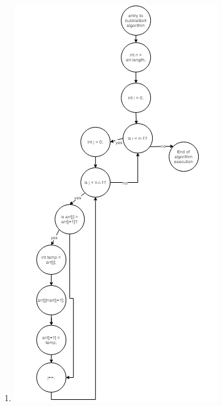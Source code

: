 \documentclass[12pt]{article}
\begin{document}
\begin{enumerate}
\item \noindent

\includegraphics{cfg.png}

\end{enumerate}
\end{document}
